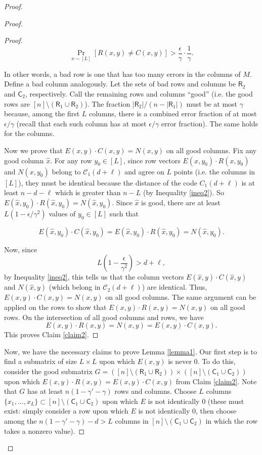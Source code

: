 \documentclass[11pt]{article}
\newcommand{\C}{\mathcal{C}}
\newcommand{\Row}{\mathsf{R}}
\newcommand{\Col}{\mathsf{C}}
\renewcommand{\d}{d}
\begin{document}
\begin{proof}
\begin{proof}
\begin{proof}
$$\Pr_{x \sim [L]}[R(x,y) \neq C(x,y)] > \frac{\epsilon}{\gamma}\cdot \frac{1}{\gamma}.$$

In other words, a bad row is one that has too many errors in the columns of $M$. Define a bad column analogously. Let the sets of bad rows and columns be $\Row_2$ and $\Col_2$, respectively.
Call the remaining rows and columns ``good'' (i.e. the good rows are $[n] \setminus (\Row_1 \cup \Row_2)$). The fraction $|\Row_2|/(n - |\Row_1|)$ must be at most $\gamma$ because, among the first $L$ columns, there is a combined error fraction of at most $\epsilon/\gamma$ (recall that each such column has at most $\epsilon/\gamma$ error fraction). The same holds for the columns.

Now we prove that $E(x,y) \cdot C(x, y) = N(x, y)$ on all good columns. Fix any good column $\hat x$. For any row $y_0 \in [L]$, since  row vectors $E (x, y_0) \cdot R(x, y_0)$ and $N(x, y_0)$ belong to $\C_1(\d + \ell)$ and agree on $L$ points (i.e. the columns in $[L]$), they must be identical because the distance of the code $C_1(\d + \ell)$ is at least  $n-\d - \ell$ which is greater than $n-L$ (by Inequality \eqref{ineq2}). So $E(\hat x, y_0) \cdot R(\hat x, y_0) = N(\hat x, y_0)$. Since $\hat x$ is good, there are at least $L\left(1-\epsilon/\gamma^2\right)$ values of $y_0 \in [L]$ such that

$$E(\hat x, y_0) \cdot C(\hat x, y_0) = E(\hat x, y_0) \cdot R(\hat x, y_0) = N(\hat x, y_0).$$

Now, since
$$L\left(1-\frac{\epsilon}{\gamma^2}\right) > \d + \ell, $$
by Inequality \eqref{ineq2}, this tells us that  the column vectors $E(\hat x, y) \cdot C(\hat x, y)$ and $N(\hat x, y)$ (which belong in $\C_2(\d + \ell)$) are identical. Thus, $E(x,y) \cdot C(x,y) = N(x,y)$ on all good columns. The same argument can be applied on the rows to show that $E(x,y) \cdot R(x,y) = N(x,y)$ on all good rows. On the intersection of all good columns and rows, we have
$$E(x,y)\cdot R(x,y)=N(x,y)=E(x,y)\cdot C(x,y).$$
This proves Claim \ref{claim2}.
\end{proof}

Now, we have the necessary claims to prove Lemma \ref{lemma1}. Our first step is to find a submatrix of size $L \times L$ upon which $E(x, y)$ is never $0$. To do this, consider the good submatrix $G = ([n] \setminus (\Row_1 \cup \Row_2)) \times ([n] \setminus (\Col_1 \cup \Col_2))$ upon which $E(x,y) \cdot R(x,y) = E(x,y) \cdot C(x,y)$ from Claim \ref{claim2}. Note that $G$ has at least $n(1-\gamma' - \gamma)$ rows and columns. Choose $L$ columns $\{x_1, \dots, x_L\} \subset [n] \setminus (\Col_1 \cup \Col_2)$ upon which $E$ is not identically $0$ (these must exist: simply consider a row upon which $E$ is not identically $0$, then choose among the $n(1-\gamma'-\gamma) - \d > L$ columns in $[n] \setminus (\Col_1 \cup \Col_2)$ in which the row takes a nonzero value). 


\end{proof}
\end{proof}
\end{document}
